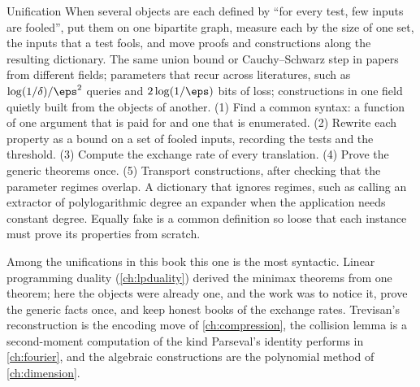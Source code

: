\begin{refsection}
\begin{move}{Unification}
 When several objects are each defined by ``for every test, few inputs are fooled'', put them on one bipartite graph, measure each by the size of one set, the inputs that a test fools, and move proofs and constructions along the resulting dictionary.
 The same union bound or Cauchy--Schwarz step in papers from different fields; parameters that recur across literatures, such as $\log(1/\delta)/\eps^2$ queries and $2\log(1/\eps)$ bits of loss; constructions in one field quietly built from the objects of another.
 (1) Find a common syntax: a function of one argument that is paid for and one that is enumerated. (2) Rewrite each property as a bound on a set of fooled inputs, recording the tests and the threshold. (3) Compute the exchange rate of every translation. (4) Prove the generic theorems once. (5) Transport constructions, after checking that the parameter regimes overlap.
 A dictionary that ignores regimes, such as calling an extractor of polylogarithmic degree an expander when the application needs constant degree. Equally fake is a common definition so loose that each instance must prove its properties from scratch.
\end{move}


Among the unifications in this book this one is the most syntactic. Linear programming duality (\cref{ch:lpduality}) derived the minimax theorems from one theorem; here the objects were already one, and the work was to notice it, prove the generic facts once, and keep honest books of the exchange rates. Trevisan's reconstruction is the encoding move of \cref{ch:compression}, the collision lemma is a second-moment computation of the kind Parseval's identity performs in \cref{ch:fourier}, and the algebraic constructions are the polynomial method of \cref{ch:dimension}.


\end{refsection}
